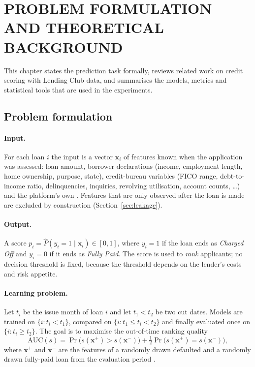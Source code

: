 \section{PROBLEM FORMULATION AND THEORETICAL BACKGROUND}
\label{ch:theory}

This chapter states the prediction task formally, reviews related work on credit scoring with Lending Club data, and summarises the models, metrics and statistical tools that are used in the experiments.

\subsection{Problem formulation}
\label{sec:formulation}

\paragraph{Input.} For each loan $i$ the input is a vector $\mathbf{x}_i$ of features known when the application was assessed: loan amount, borrower declarations (income, employment length, home ownership, purpose, state), credit-bureau variables (FICO range, debt-to-income ratio, delinquencies, inquiries, revolving utilisation, account counts, \dots) and the platform's own . Features that are only observed after the loan is made are excluded by construction (Section~\ref{sec:leakage}).

\paragraph{Output.} A score $p_i=\hat{P}(y_i=1\mid\mathbf{x}_i)\in[0,1]$, where $y_i=1$ if the loan ends as \emph{Charged Off} and $y_i=0$ if it ends as \emph{Fully Paid}. The score is used to \emph{rank} applicants; no decision threshold is fixed, because the threshold depends on the lender's costs and risk appetite.

\paragraph{Learning problem.} Let $t_i$ be the issue month of loan $i$ and let $t_1<t_2$ be two cut dates. Models are trained on $\{i: t_i<t_1\}$, compared on $\{i: t_1\le t_i<t_2\}$ and finally evaluated once on $\{i: t_i\ge t_2\}$. The goal is to maximise the out-of-time ranking quality
\begin{equation}
\mathrm{AUC}(s)=\Pr\big(s(\mathbf{x}^{+})>s(\mathbf{x}^{-})\big)+\tfrac12\Pr\big(s(\mathbf{x}^{+})=s(\mathbf{x}^{-})\big),
\label{eq:auc}
\end{equation}
where $\mathbf{x}^{+}$ and $\mathbf{x}^{-}$ are the features of a randomly drawn defaulted and a randomly drawn fully-paid loan from the evaluation period \cite{hanley1982,fawcett2006}.


